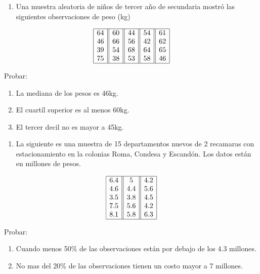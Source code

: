 \documentclass[
  a4paper,
  oneside,
  openany]{book}
\providecommand{\tightlist}{%
  \setlength{\itemsep}{0pt}\setlength{\parskip}{0pt}}
\begin{document}
\begin{enumerate}
\def\labelenumi{\arabic{enumi}.}
\tightlist
\item
  Una muestra aleatoria de niños de tercer año de secundaria mostró las siguientes observaciones de peso (kg)
\end{enumerate}

\[
\begin{array}{|c| |c| |c| |c| |c|} 
\hline
64& 60& 44& 54& 61\\
46& 66& 56& 42& 62\\
39& 54& 68& 64& 65\\
75& 38& 53& 58&46\\
\hline
\end{array}
\]

Probar:

\begin{enumerate}
\def\labelenumi{\alph{enumi})}
\item
  La mediana de los pesos es 46kg.
\item
  El cuartíl superior es al menos 60kg.
\item
  El tercer decil no es mayor a 45kg.
\end{enumerate}

\begin{enumerate}
\def\labelenumi{\arabic{enumi}.}
\setcounter{enumi}{1}
\tightlist
\item
  La siguiente es una muestra de 15 departamentos nuevos de 2 recamaras con estacionamiento en la colonias Roma, Condesa y Escandón. Los datos están en millones de pesos.
\end{enumerate}

\[
\begin{array}{|c| |c| |c|} 
\hline
6.4&    5&  4.2\\
4.6&    4.4&    5.6\\
3.5&    3.8&    4.5\\
7.5&    5.6&    4.2\\
8.1&    5.8&    6.3\\
\hline
\end{array}
\]

Probar:

\begin{enumerate}
\def\labelenumi{\alph{enumi})}
\item
  Cuando menos 50\% de las observaciones están por debajo de los 4.3 millones.
\item
  No mas del 20\% de las observaciones tienen un costo mayor a 7 millones.
\end{enumerate}
\end{document}
